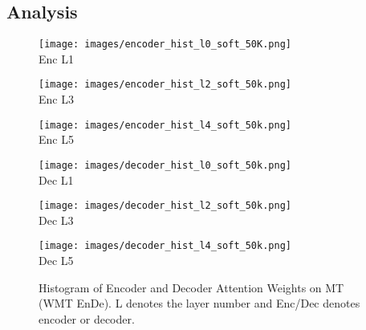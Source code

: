 \documentclass{article} \usepackage{iclr2021_conference,times}
\begin{document}
\subsection{Analysis}

\begin{figure}[H]
\begin{minipage}{0.16\linewidth}
  \centering
     \texttt{[image: images/encoder\_hist\_l0\_soft\_50K.png]}
    \\ {Enc L1}
    \label{fig:sortiter}
\end{minipage}\hfill
\begin{minipage}{0.16\linewidth}
  \centering
     \texttt{[image: images/encoder\_hist\_l2\_soft\_50k.png]}
    \\ {Enc L3}
    \label{fig:sortiter}
\end{minipage}\hfill
\begin{minipage}{0.16\linewidth}
  \centering
     \texttt{[image: images/encoder\_hist\_l4\_soft\_50k.png]}
    \\ {Enc L5}
    \label{fig:sortiter}
\end{minipage}\hfill 
\label{fig:hist1}
\begin{minipage}{0.16\linewidth}
  \centering
     \texttt{[image: images/decoder\_hist\_l0\_soft\_50k.png]}
    \\ {Dec L1}
    \label{fig:sortiter}
\end{minipage}\hfill 
\label{fig:analysis}
\begin{minipage}{0.16\linewidth}
  \centering
     \texttt{[image: images/decoder\_hist\_l2\_soft\_50k.png]}
    \\ {Dec L3}
    \label{fig:sortiter}
\end{minipage}\hfill 
\label{fig:analysis}
\begin{minipage}{0.16\linewidth}
  \centering
     \texttt{[image: images/decoder\_hist\_l4\_soft\_50k.png]}
    \\ {Dec L5}
    \label{fig:sortiter}
\end{minipage}\hfill 
\label{fig:hist2}
\caption{Histogram of Encoder and Decoder Attention Weights on MT (WMT EnDe). L denotes the layer number and Enc/Dec denotes encoder or decoder.}
\label{hist}
\end{figure}
\end{document}
